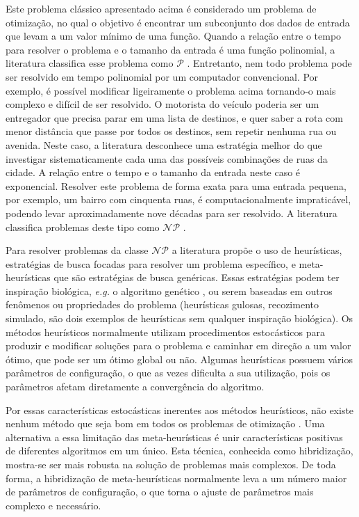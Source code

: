 Este problema clássico apresentado acima é considerado um problema de otimização, no qual o objetivo é encontrar um subconjunto dos dados de entrada que levam a um valor mínimo de uma função. Quando a relação entre o tempo para resolver o problema e o tamanho da entrada é uma função polinomial, a literatura classifica esse problema como $\mathcal{P}$ \cite{karp1972}. Entretanto, nem todo problema pode ser resolvido em tempo polinomial por um computador convencional. Por exemplo, é possível modificar ligeiramente o problema acima tornando-o mais complexo e difícil de ser resolvido. O motorista do veículo poderia ser um entregador que precisa parar em uma lista de destinos, e quer saber a rota com menor distância que passe por todos os destinos, sem repetir nenhuma rua ou avenida. Neste caso, a literatura desconhece uma estratégia melhor do que investigar sistematicamente cada uma das possíveis combinações de ruas da cidade. A relação entre o tempo e o tamanho da entrada neste caso é exponencial. Resolver este problema de forma exata para uma entrada pequena, por exemplo, um bairro com cinquenta ruas, é computacionalmente impraticável, podendo levar aproximadamente nove décadas para ser resolvido. A literatura classifica problemas deste tipo como $\mathcal{NP}$ \cite{li2015}.

Para resolver problemas da classe $\mathcal{NP}$ a literatura propõe o uso de heurísticas, estratégias de busca focadas para resolver um problema específico, e meta-heurísticas que são estratégias de busca genéricas. Essas estratégias podem ter inspiração biológica, \textit{e.g.} o algoritmo genético \cite{whitley1994}, ou serem baseadas em outros fenômenos ou propriedades do problema (heurísticas gulosas, recozimento simulado, são dois exemplos de heurísticas sem qualquer inspiração biológica). Os métodos heurísticos normalmente utilizam procedimentos estocásticos para produzir e modificar soluções para o problema e caminhar em direção a um valor ótimo, que pode ser um ótimo global ou não. Algumas heurísticas possuem vários parâmetros de configuração, o que as vezes dificulta a sua utilização, pois os parâmetros afetam diretamente a convergência do algoritmo. 

Por essas características estocásticas inerentes aos métodos heurísticos, não existe nenhum método que seja bom em todos os problemas de otimização \cite[p. 30-32]{eiben2015}. Uma alternativa a essa limitação das meta-heurísticas é unir características positivas de diferentes algoritmos em um único. Esta técnica, conhecida como hibridização,  mostra-se ser mais robusta na solução de problemas mais complexos. De toda forma, a hibridização de meta-heurísticas normalmente leva a um número maior de parâmetros de configuração, o que torna o ajuste de parâmetros mais complexo e necessário.


